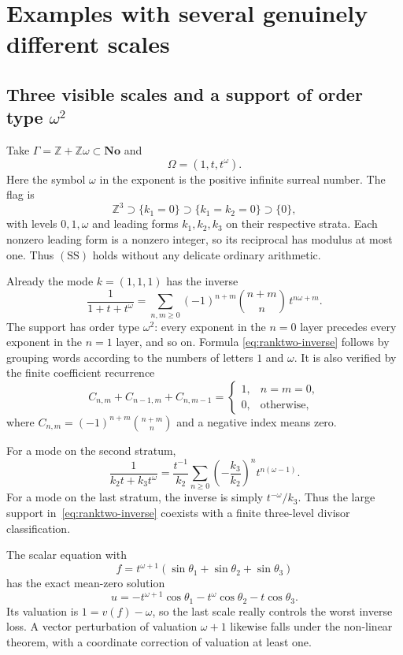 \documentclass[11pt,letterpaper]{article}
\theoremstyle{definition}
\theoremstyle{remark}
\newcommand{\No}{\mathbf{No}}
\newcommand{\Z}{\mathbb Z}
\newcommand{\SDcond}{\mathrm{SS}}
\numberwithin{equation}{section}
\begin{document}
\section{Examples with several genuinely different scales}
\label{sec:examples}

\subsection{Three visible scales and a support of order type \texorpdfstring{$\omega^2$}{omega squared}}

Take $\Gamma=\Z+\Z\omega\subset\No$ and
\begin{equation}\label{eq:three-frequencies}
 \Omega=(1,t,t^\omega).
\end{equation}
Here the symbol $\omega$ in the exponent is the positive infinite surreal
number.  The flag is
\[
 \Z^3\supset\{k_1=0\}\supset\{k_1=k_2=0\}\supset\{0\},
\]
with levels $0,1,\omega$ and leading forms $k_1,k_2,k_3$ on their respective
strata.  Each nonzero leading form is a nonzero integer, so its reciprocal
has modulus at most one.  Thus $(\SDcond)$ holds without any delicate ordinary
arithmetic.

Already the mode $k=(1,1,1)$ has the inverse
\begin{equation}\label{eq:ranktwo-inverse}
 \frac1{1+t+t^\omega}
 =\sum_{n,m\ge0}(-1)^{n+m}\binom{n+m}{n}\,t^{n\omega+m}.
\end{equation}
The support has order type $\omega^2$: every exponent in the $n=0$ layer
precedes every exponent in the $n=1$ layer, and so on.  Formula
\eqref{eq:ranktwo-inverse} follows by grouping words according to the numbers
of letters $1$ and $\omega$.  It is also verified by the finite coefficient
recurrence
\[
 C_{n,m}+C_{n-1,m}+C_{n,m-1}
 =\begin{cases}1,&n=m=0,\\0,&\text{otherwise},\end{cases}
\]
where $C_{n,m}=(-1)^{n+m}\binom{n+m}{n}$ and a negative index means zero.

For a mode on the second stratum,
\[
 \frac1{k_2t+k_3t^\omega}
 =\frac{t^{-1}}{k_2}
  \sum_{n\ge0}\left(-\frac{k_3}{k_2}\right)^n t^{n(\omega-1)}.
\]
For a mode on the last stratum, the inverse is simply $t^{-\omega}/k_3$.
Thus the large support in~\eqref{eq:ranktwo-inverse} coexists with a finite
three-level divisor classification.

The scalar equation with
\[
 f=t^{\omega+1}(\sin\theta_1+\sin\theta_2+\sin\theta_3)
\]
has the exact mean-zero solution
\begin{equation}\label{eq:three-solution}
 u=-t^{\omega+1}\cos\theta_1-t^\omega\cos\theta_2-t\cos\theta_3.
\end{equation}
Its valuation is $1=v(f)-\omega$, so the last scale really controls the
worst inverse loss.  A vector perturbation of valuation $\omega+1$ likewise
falls under the non-linear theorem, with a coordinate correction of
valuation at least one.
\end{document}

